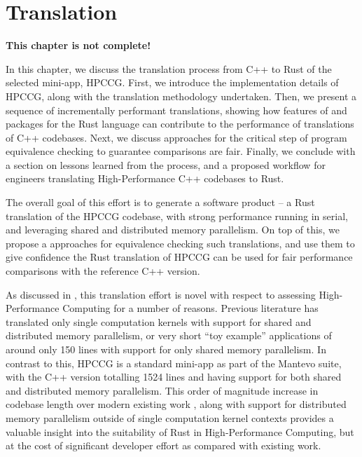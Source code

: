 
\chapter{Translation}
\label{ch:translation} %

\textbf{This chapter is not complete!}

In this chapter, we discuss the translation process from C++ to Rust of the selected mini-app, HPCCG. First, we introduce the implementation details of HPCCG, along with the translation methodology undertaken. Then, we present a sequence of incrementally performant translations, showing how features of and packages for the Rust language can contribute to the performance of translations of C++ codebases. Next, we discuss approaches for the critical step of program equivalence checking to guarantee comparisons are fair. Finally, we conclude with a section on lessons learned from the process, and a proposed workflow for engineers translating High-Performance C++ codebases to Rust.

The overall goal of this effort is to generate a software product -- a Rust translation of the HPCCG codebase, with strong performance running in serial, and leveraging shared and distributed memory parallelism. On top of this, we propose a approaches for equivalence checking such translations, and use them to give confidence the Rust translation of HPCCG can be used for fair performance comparisons with the reference C++ version.

As discussed in , this translation effort is novel with respect to assessing High-Performance Computing for a number of reasons. Previous literature has translated only single computation kernels \cite{} with support for shared and distributed memory parallelism, or very short ``toy example'' applications of around only 150 lines \cite{} \cite{} with support for only shared memory parallelism. In contrast to this, HPCCG is a standard mini-app as part of the Mantevo suite, with the C++ version totalling 1524 lines and having support for both shared and distributed memory parallelism. This order of magnitude increase in codebase length over modern existing work \cite{moranEmergingTechnologiesRust2023} \cite{costanzoPerformanceVsProgramming2021}, along with support for distributed memory parallelism outside of single computation kernel contexts provides a valuable insight into the suitability of Rust in High-Performance Computing, but at the cost of significant developer effort as compared with existing work.

